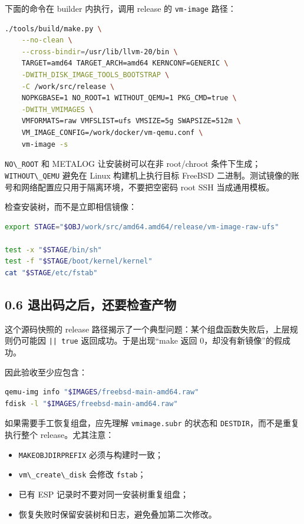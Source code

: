 \documentclass[
  11pt,
  UTF8,
  a4paper,
  fontset=fandol]{ctexart}
\newcommand{\passthrough}[1]{#1}
\providecommand{\tightlist}{%
  \setlength{\itemsep}{0pt}\setlength{\parskip}{0pt}}
\begin{document}
下面的命令在 builder 内执行，调用 release 的
\passthrough{\lstinline!vm-image!} 路径：

\begin{lstlisting}[language=sh]
./tools/build/make.py \
    --no-clean \
    --cross-bindir=/usr/lib/llvm-20/bin \
    TARGET=amd64 TARGET_ARCH=amd64 KERNCONF=GENERIC \
    -DWITH_DISK_IMAGE_TOOLS_BOOTSTRAP \
    -C /work/src/release \
    NOPKGBASE=1 NO_ROOT=1 WITHOUT_QEMU=1 PKG_CMD=true \
    -DWITH_VMIMAGES \
    VMFORMATS=raw VMFSLIST=ufs VMSIZE=5g SWAPSIZE=512m \
    VM_IMAGE_CONFIG=/work/docker/vm-qemu.conf \
    vm-image -s
\end{lstlisting}

\passthrough{\lstinline!NO\_ROOT!} 和 METALOG 让安装树可以在非
root/chroot 条件下生成；\passthrough{\lstinline!WITHOUT\_QEMU!} 避免在
Linux 构建机上执行目标 FreeBSD
二进制。测试镜像的账号和网络配置应只用于隔离环境，不要把空密码 root SSH
当成通用模板。

检查安装树，而不是立即相信镜像：

\begin{lstlisting}[language=sh]
export STAGE="$OBJ/work/src/amd64.amd64/release/vm-image-raw-ufs"

test -x "$STAGE/bin/sh"
test -f "$STAGE/boot/kernel/kernel"
cat "$STAGE/etc/fstab"
\end{lstlisting}

\subsection{0.6
退出码之后，还要检查产物}\label{ux9000ux51faux7801ux4e4bux540eux8fd8ux8981ux68c0ux67e5ux4ea7ux7269}

这个源码快照的 release
路径揭示了一个典型问题：某个组盘函数失败后，上层规则仍可能因
\passthrough{\lstinline!|| true!} 返回成功。于是出现``make 返回
0，却没有新镜像''的假成功。

因此验收至少应包含：

\begin{lstlisting}[language=sh]
qemu-img info "$IMAGES/freebsd-main-amd64.raw"
fdisk -l "$IMAGES/freebsd-main-amd64.raw"
\end{lstlisting}

如果需要手工恢复组盘，应先理解 \passthrough{\lstinline!vmimage.subr!}
的状态和 \passthrough{\lstinline!DESTDIR!}，而不是重复执行整个
release。尤其注意：

\begin{itemize}
\tightlist
\item
  \passthrough{\lstinline!MAKEOBJDIRPREFIX!} 必须与构建时一致；
\item
  \passthrough{\lstinline!vm\_create\_disk!} 会修改
  \passthrough{\lstinline!fstab!}；
\item
  已有 ESP 记录时不要对同一安装树重复组盘；
\item
  恢复失败时保留安装树和日志，避免叠加第二次修改。
\end{itemize}
\end{document}
